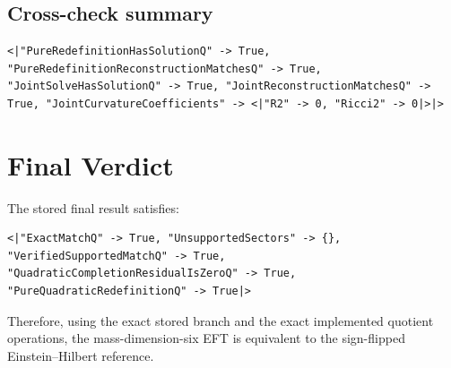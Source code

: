 \documentclass[11pt]{article}
\begin{document}
\subsection{Cross-check summary}
\begin{verbatim}
<|"PureRedefinitionHasSolutionQ" -> True, "PureRedefinitionReconstructionMatchesQ" -> True, "JointSolveHasSolutionQ" -> True, "JointReconstructionMatchesQ" -> True, "JointCurvatureCoefficients" -> <|"R2" -> 0, "Ricci2" -> 0|>|>
\end{verbatim}

\section{Final Verdict}

The stored final result satisfies:

\begin{verbatim}
<|"ExactMatchQ" -> True, "UnsupportedSectors" -> {}, "VerifiedSupportedMatchQ" -> True, "QuadraticCompletionResidualIsZeroQ" -> True, "PureQuadraticRedefinitionQ" -> True|>
\end{verbatim}

Therefore, using the exact stored branch and the exact implemented quotient operations, the mass-dimension-six EFT is equivalent to the sign-flipped Einstein--Hilbert reference.
\end{document}
